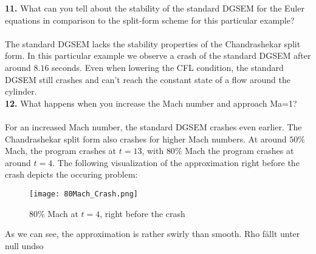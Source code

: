 \documentclass[11pt]{scrartcl}
\begin{document}
\textbf{11.} What can you tell about the stability of the standard DGSEM for the Euler equations in comparison to the split-form scheme for this particular example?\\ \ \\
The standard DGSEM lacks the stability properties of the Chandrashekar split form. In this particular example we observe a crash of the standard DGSEM after around $8.16$ seconds. Even when lowering the CFL condition, the standard DGSEM still crashes and can't reach the constant state of a flow around the cylinder.\\
\textbf{12.} What happens when you increase the Mach number and approach Ma=1? \\ \ \\
For an increased Mach number, the standard DGSEM crashes even earlier. The Chandrashekar split form also crashes for higher Mach numbers. At around $50\%$ Mach, the program crashes at $t = 13$, with $80\%$ Mach the program crashes at around $t=4$. The following visualization of the approximation right before the crash depicts the occuring problem: \\
\begin{figure}[H]
\texttt{[image: 80Mach\_Crash.png]}
\caption{80\% Mach at $t=4$, right before the crash}
\end{figure}
As we can see, the approximation is rather swirly than smooth. Rho fällt unter null undso


\newpage
{}


\end{document}
